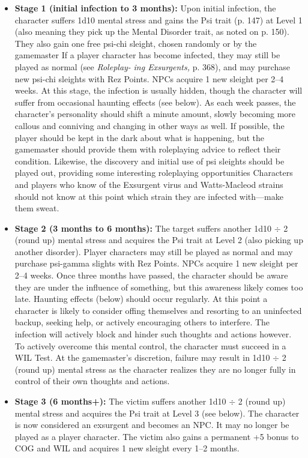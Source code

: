 \begin{itemize} \item \textbf{Stage 1 (initial infection to 3 months):} Upon initial infection, the character suffers 1d10 mental stress and gains the Psi trait (p. 147) at Level 1 (also meaning they pick up the Mental Disorder trait, as noted on p. 150). They also gain one free psi-chi sleight, chosen randomly or by the gamemaster If a player character has become infected, they may still be played as normal (see \textit{Roleplay-} \textit{ing Exsurgents,} p. 368), and may purchase new psi-chi sleights with Rez Points. NPCs acquire 1 new sleight per 2–4 weeks. At this stage, the infection is usually hidden, though the character will suffer from occasional haunting effects (see below). As each week passes, the character's personality should shift a minute amount, slowly becoming more callous and conniving and changing in other ways as well. If possible, the player should be kept in the dark about what is happening, but the gamemaster should provide them with roleplaying advice to reflect their condition. Likewise, the discovery and initial use of psi sleights should be played out, providing some interesting roleplaying opportunities Characters and players who know of the Exsurgent virus and Watts-Macleod strains should not know at this point which strain they are infected with—make them sweat. \item \textbf{Stage 2 (3 months to 6 months):} The target suffers another 1d10 $\div$ 2 (round up) mental stress and acquires the Psi trait at Level 2 (also picking up another disorder). Player characters may still be played as normal and may purchase psi-gamma slights with Rez Points. NPCs acquire 1 new sleight per 2–4 weeks. Once three months have passed, the character should be aware they are under the influence of something, but this awareness likely comes too late. Haunting effects (below) should occur regularly. At this point a character is likely to consider offing themselves and resorting to an uninfected backup, seeking help, or actively encouraging others to interfere. The infection will actively block and hinder such thoughts and actions however. To actively overcome this mental control, the character must succeed in a WIL Test. At the gamemaster's discretion, failure may result in 1d10 $\div$ 2 (round up) mental stress as the character realizes they are no longer fully in control of their own thoughts and actions. \item \textbf{Stage 3 (6 months+):} The victim suffers another 1d10 $\div$ 2 (round up) mental stress and acquires the Psi trait at Level 3 (see below). The character is now considered an exsurgent and becomes an NPC. It may no longer be played as a player character. The victim also gains a permanent +5 bonus to COG and WIL and acquires 1 new sleight every 1–2 months. \end{itemize} 

